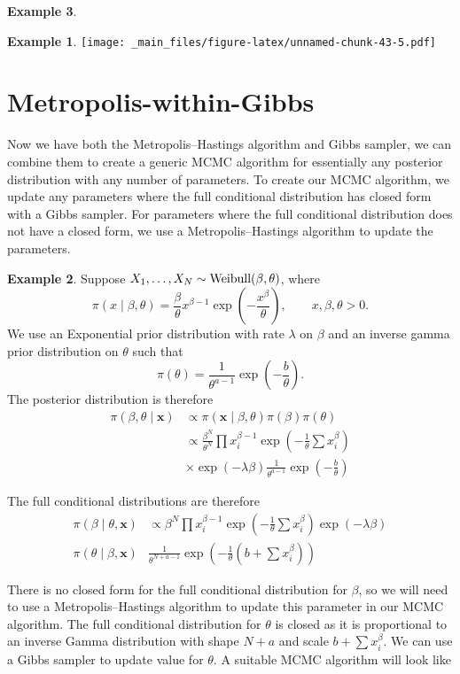 \documentclass[
]{book}
\theoremstyle{definition}
\theoremstyle{definition}
\newtheorem{example}{Example}[chapter]
\theoremstyle{definition}
\theoremstyle{definition}
\theoremstyle{remark}
\begin{document}
\begin{example}
\begin{example}
\texttt{[image: \_main\_files/figure-latex/unnamed-chunk-43-5.pdf]}
\end{example}

\hypertarget{metropolis-within-gibbs}{%
\section{Metropolis-within-Gibbs}\label{metropolis-within-gibbs}}

Now we have both the Metropolis--Hastings algorithm and Gibbs sampler, we can combine them to create a generic MCMC algorithm for essentially any posterior distribution with any number of parameters. To create our MCMC algorithm, we update any parameters where the full conditional distribution has closed form with a Gibbs sampler. For parameters where the full conditional distribution does not have a closed form, we use a Metropolis--Hastings algorithm to update the parameters.

\begin{example}
Suppose \(X_1, \ldots, X_N \sim \hbox{Weibull}(\beta, \theta)\), where
\[
\pi(x \mid\beta,\theta) = \frac{\beta}{\theta}x^{\beta - 1}\exp\left(-\frac{x^\beta}{\theta}\right), \qquad x, \beta, \theta > 0. 
\]
We use an Exponential prior distribution with rate \(\lambda\) on \(\beta\) and an inverse gamma prior distribution on \(\theta\) such that
\[
\pi(\theta) = \frac{1}{\theta^{a - 1}}\exp\left(-\frac{b}{\theta}\right).
\]
The posterior distribution is therefore
\begin{align*}
\pi(\beta, \theta \mid \boldsymbol{x}) &\propto \pi(\boldsymbol{x} \mid \beta, \theta)\pi(\beta)\pi(\theta) \\
&\propto \frac{\beta^N}{\theta^N}\prod x_i^{\beta - 1}\exp\left(-\frac{1}{\theta}\sum x_i^\beta\right)
\\
&\times\exp(-\lambda\beta) \frac{1}{\theta^{a - 1}}\exp\left(-\frac{b}{\theta}\right)
\end{align*}

The full conditional distributions are therefore
\begin{align*}
\pi(\beta \mid \theta, \boldsymbol{x}) &\propto\beta^N\prod x_i^{\beta - 1}\exp\left(-\frac{1}{\theta}\sum x_i^\beta\right)\exp(-\lambda\beta) \\
\pi(\theta \mid \beta, \boldsymbol{x}) & \frac{1}{\theta^{N + a -1}}\exp\left(-\frac{1}{\theta}(b + \sum x_i^\beta)\right)
\end{align*}

There is no closed form for the full conditional distribution for \(\beta\), so we will need to use a Metropolis--Hastings algorithm to update this parameter in our MCMC algorithm. The full conditional distribution for \(\theta\) is closed as it is proportional to an inverse Gamma distribution with shape \(N + a\) and scale \(b + \sum x_i^\beta\). We can use a Gibbs sampler to update value for \(\theta\). A suitable MCMC algorithm will look like


\end{example}
\end{example}
\end{document}
